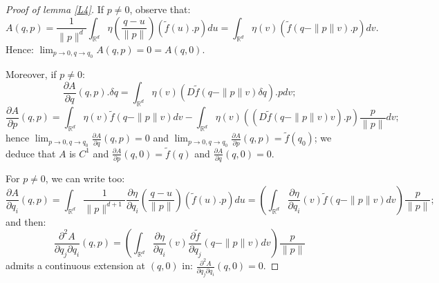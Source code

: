 \documentclass{dcds}
\theoremstyle{definition}
\begin{document}
 \begin{proof}[Proof of lemma \ref{L4}]
 If $p\not=0$, observe that:
 $$A(q, p)=\frac{1}{\| p\|^d}\int_{{\mathbb {R}}^d}\eta\left( \frac{  q-u }{\| p\|}\right) (\tilde f(u).p)du=\int_{{\mathbb {R}}^d}\eta (  v )( \tilde f(q-\| p\|v).p)dv.$$
 Hence: $\displaystyle{\lim_{p\rightarrow 0, q\rightarrow q_0}A(q,p)=0=A(q,0)}$.

 Moreover, if $p\not=0$:
 $$\frac{\partial A}{\partial q}(q,p).\delta q=\int_{{\mathbb {R}}^d}\eta(v)(D\tilde  f(q-\| p\| v)\delta q).pdv;$$
$$\frac{\partial A}{\partial p}(q,p)=\int_{{\mathbb {R}}^d}\eta(v)\tilde f(q-\| p\| v)dv-\int_{{\mathbb {R}}^d}\eta(v)\left((D\tilde  f(q-\| p\| v)v).p\right)\frac{p}{\| p\|}dv;$$
 hence $\displaystyle{\lim_{p\rightarrow 0, q\rightarrow q_0}\frac{\partial A}{\partial q}(q,p)=0}$ and $\displaystyle{\lim_{p\rightarrow 0, q\rightarrow q_0}\frac{\partial A}{\partial p}(q,p)=\tilde f(q_0)}$; we deduce that $A$ is $C^1$ and
 $\frac{\partial A}{\partial p}(q,0)=\tilde f(q)$ and $\frac{\partial A}{\partial q}(q,0)=0$.

 For $p\not=0$, we can write too: $$\frac{\partial A}{\partial q_i}(q,p)=\int_{{\mathbb {R}}^d}\frac{1}{\| p\|^{d+1}}\frac{\partial\eta}{\partial q_i}(\frac{q-u}{\| p\|})(\tilde f(u).p)du=\left( \int_{{\mathbb {R}}^d}\frac{\partial\eta}{\partial q_i}(v)\tilde f(q-\| p\| v)dv\right) \frac{p}{\| p\|};$$
 and then:
 $$\frac{\partial^2A}{\partial q_j\partial q_i}(q,p)=\left( \int_{{\mathbb {R}}^d}\frac{\partial \eta}{\partial q_i}(v)\frac{\partial\tilde f}{\partial q_j}(q-\| p\|v)dv\right)\frac{p}{\| p\|}$$
 admits a continuous extension at $(q,0)$ in:
  $\frac{\partial^2A}{\partial q_j\partial q_i}(q,0)=0$.


\end{proof}
\end{document}
